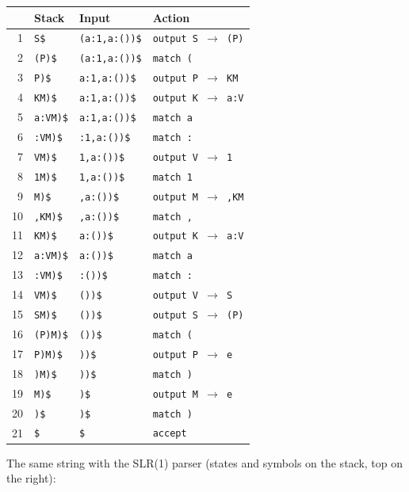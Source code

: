 \documentclass[11pt]{article}
\begin{document}
{\small
\begin{longtable}{rlll}
\toprule
& Stack & Input & Action \\
\midrule
1 & \texttt{S\$} & \texttt{(a:1,{}a:())\$} & \texttt{output S $\to$ (P)} \\
2 & \texttt{(P)\$} & \texttt{(a:1,{}a:())\$} & \texttt{match (} \\
3 & \texttt{P)\$} & \texttt{a:1,{}a:())\$} & \texttt{output P $\to$ KM} \\
4 & \texttt{KM)\$} & \texttt{a:1,{}a:())\$} & \texttt{output K $\to$ a:V} \\
5 & \texttt{a:VM)\$} & \texttt{a:1,{}a:())\$} & \texttt{match a} \\
6 & \texttt{:VM)\$} & \texttt{:1,{}a:())\$} & \texttt{match :} \\
7 & \texttt{VM)\$} & \texttt{1,{}a:())\$} & \texttt{output V $\to$ 1} \\
8 & \texttt{1M)\$} & \texttt{1,{}a:())\$} & \texttt{match 1} \\
9 & \texttt{M)\$} & \texttt{,{}a:())\$} & \texttt{output M $\to$ ,{}KM} \\
10 & \texttt{,{}KM)\$} & \texttt{,{}a:())\$} & \texttt{match ,{}} \\
11 & \texttt{KM)\$} & \texttt{a:())\$} & \texttt{output K $\to$ a:V} \\
12 & \texttt{a:VM)\$} & \texttt{a:())\$} & \texttt{match a} \\
13 & \texttt{:VM)\$} & \texttt{:())\$} & \texttt{match :} \\
14 & \texttt{VM)\$} & \texttt{())\$} & \texttt{output V $\to$ S} \\
15 & \texttt{SM)\$} & \texttt{())\$} & \texttt{output S $\to$ (P)} \\
16 & \texttt{(P)M)\$} & \texttt{())\$} & \texttt{match (} \\
17 & \texttt{P)M)\$} & \texttt{))\$} & \texttt{output P $\to$ e} \\
18 & \texttt{)M)\$} & \texttt{))\$} & \texttt{match )} \\
19 & \texttt{M)\$} & \texttt{)\$} & \texttt{output M $\to$ e} \\
20 & \texttt{)\$} & \texttt{)\$} & \texttt{match )} \\
21 & \texttt{\$} & \texttt{\$} & \texttt{accept} \\
\bottomrule
\end{longtable}}

\noindent The same string with the SLR(1) parser (states and symbols on the
stack, top on the right):
\end{document}
